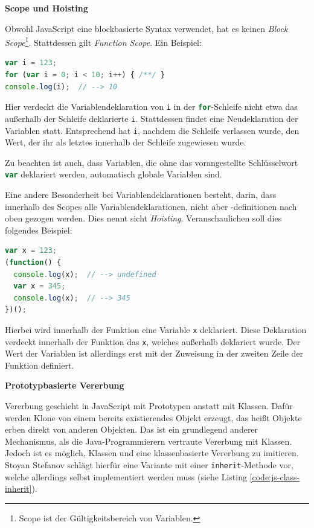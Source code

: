 \documentclass[a4paper, 12pt, hidelinks, listof=totoc, listoftables=totoc, bibliography=totoc]{scrreprt}
\newcommand{\js}[1]{\lstinline[language=JavaScript, style=inline]|#1|}
\newcommand{\MyMiniSec}[1]{\rmfamily\fontsize{12}{15}\selectfont
	\vspace{7pt}\textbf{#1} %
}
\begin{document}
\MyMiniSec{Scope und Hoisting}

Obwohl JavaScript eine blockbasierte Syntax verwendet, hat es keinen \emph{Block Scope}\footnote{Scope ist der Gültigkeitsbereich von Variablen.}. Stattdessen gilt \emph{Function Scope}. Ein Beispiel:

\begin{lstlisting}[language=JavaScript, style=snippet]
var i = 123;
for (var i = 0; i < 10; i++) { /**/ }
console.log(i);  // --> 10
\end{lstlisting}

Hier verdeckt die Variablendeklaration von \js{i} in der \js{for}-Schleife nicht etwa das außerhalb der Schleife deklarierte \js{i}. Stattdessen findet eine Neudeklaration der Variablen statt. Entsprechend hat \js{i}, nachdem die Schleife verlassen wurde, den Wert, der ihr als letztes innerhalb der Schleife zugewiesen wurde.

Zu beachten ist auch, dass Variablen, die ohne das vorangestellte Schlüsselwort \js{var} deklariert werden, automatisch globale Variablen sind.

Eine andere Besonderheit bei Variablendeklarationen besteht, darin, dass innerhalb des Scopes alle Variablendeklarationen, nicht aber -definitionen nach oben gezogen werden. Dies nennt sicht \emph{Hoisting}. Veranschaulichen soll dies folgendes Beispiel:

\begin{lstlisting}[language=JavaScript, style=snippet]
var x = 123;
(function() {
  console.log(x);  // --> undefined
  var x = 345;
  console.log(x);  // --> 345
})();
\end{lstlisting}

Hierbei wird innerhalb der Funktion eine Variable \js{x} deklariert. Diese Deklaration verdeckt 
innerhalb der Funktion das \js{x}, welches außerhalb deklariert wurde. Der Wert der Variablen ist allerdings erst mit der Zuweisung in der zweiten Zeile der Funktion definiert.


\MyMiniSec{Prototypbasierte Vererbung}

Vererbung geschieht in JavaScript mit Prototypen anstatt mit Klassen. Dafür werden Klone von einem bereits existierendes Objekt erzeugt, das heißt Objekte erben direkt von anderen Objekten. Das ist ein grundlegend anderer Mechanismus, als die Java-Programmierern vertraute Vererbung mit Klassen. Jedoch ist es möglich, Klassen und eine klassenbasierte Vererbung zu imitieren. Stoyan Stefanov schlägt hierfür eine Variante mit einer \js{inherit}-Methode vor, welche allerdings selbst implementiert werden muss (siehe Listing \ref{code:js-class-inherit}).
\end{document}
